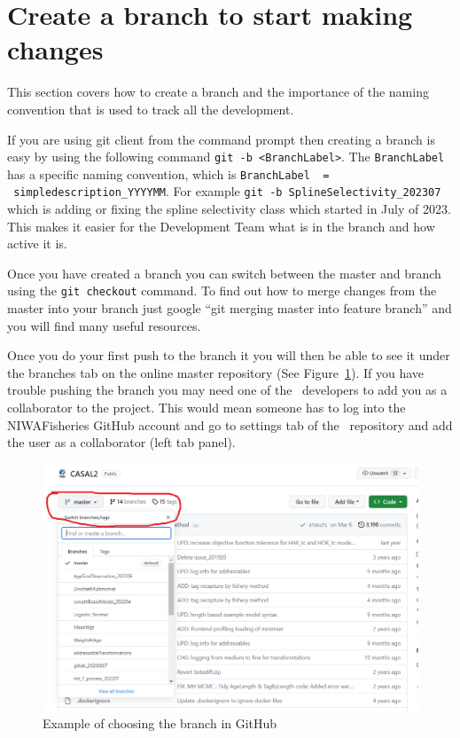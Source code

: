\section{Create a branch to start making changes\label{sec:maintain_repo}}

This section covers how to create a branch and the importance of the naming convention that is used to track all the development. 

If you are using git client from the command prompt then creating a branch is easy by using the following command \texttt{git -b <BranchLabel>}. The \texttt{BranchLabel} has a specific naming convention, which is  \texttt{BranchLabel \ = \ simpledescription\_YYYYMM}. For example \texttt{git -b SplineSelectivity\_202307} which is adding or fixing the spline selectivity class which started in July of 2023. This makes it easier for the Development Team what is in the branch and how active it is.

Once you have created a branch you can switch between the master and branch using the \texttt{git checkout} command. To find out how to merge changes from the master into your branch just google \enquote{git merging master into feature branch} and you will find many useful resources.

Once you do your first push to the branch it you will then be able to see it under the branches tab on the online master repository (See Figure~\ref{fig:branchtab}). If you have trouble pushing the branch you may need one of the \CNAME\ developers to add you as a collaborator to the project. This would mean someone has to log into the NIWAFisheries GitHub account and go to settings tab of the \CNAME\ repository and add the user as a collaborator (left tab panel).

\begin{figure}[!ht]
	\centering
	\includegraphics[scale=0.6]{Figures/branch_tab.png}
	\caption{Example of choosing the branch in GitHub}\label{fig:branchtab}
\end{figure}